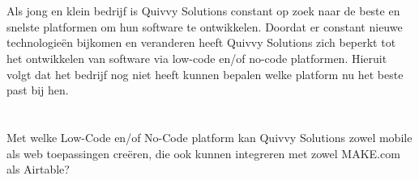 \section{}%
\label{sec:probleemstelling}
Als jong en klein bedrijf is Quivvy Solutions constant op zoek naar de beste en snelste platformen om hun software te ontwikkelen. 
Doordat er constant nieuwe technologieën bijkomen en veranderen heeft Quivvy Solutions zich beperkt tot het ontwikkelen van software 
via low-code en/of no-code platformen. Hieruit volgt dat het bedrijf nog niet heeft kunnen bepalen welke platform nu het beste past bij hen.

\section{}%
\label{sec:onderzoeksvraag}
Met welke Low-Code en/of No-Code platform kan Quivvy Solutions zowel mobile als web toepassingen creëren, die ook kunnen integreren met
zowel MAKE.com als Airtable?

